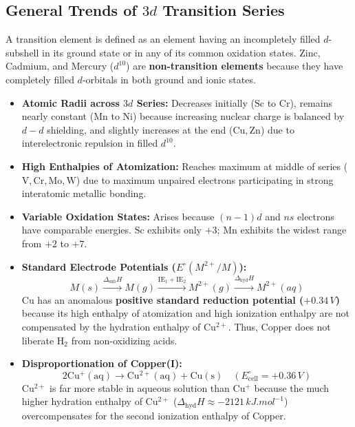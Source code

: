 \documentclass[10pt,a4paper]{article}
\begin{document}
\subsection{General Trends of $3d$ Transition Series}
A transition element is defined as an element having an incompletely filled $d$-subshell in its ground state or in any of its common oxidation states. Zinc, Cadmium, and Mercury ($d^{10}$) are \textbf{non-transition elements} because they have completely filled $d$-orbitals in both ground and ionic states.
\begin{itemize}
  \item \textbf{Atomic Radii across $3d$ Series:} Decreases initially ($\mathrm{Sc}$ to $\mathrm{Cr}$), remains nearly constant ($\mathrm{Mn}$ to $\mathrm{Ni}$) because increasing nuclear charge is balanced by $d-d$ shielding, and slightly increases at the end ($\mathrm{Cu, Zn}$) due to interelectronic repulsion in filled $d^{10}$.
  \item \textbf{High Enthalpies of Atomization:} Reaches maximum at middle of series ($\mathrm{V, Cr, Mo, W}$) due to maximum unpaired electrons participating in strong interatomic metallic bonding.
  \item \textbf{Variable Oxidation States:} Arises because $(n-1)d$ and $ns$ electrons have comparable energies. $\mathrm{Sc}$ exhibits only $+3$; $\mathrm{Mn}$ exhibits the widest range from $+2$ to $+7$.
  \item \textbf{Standard Electrode Potentials ($E^\circ(M^{2+}/M)$):}
  \begin{equation}
    M(s) \xrightarrow{\Delta_{\text{sub}} H} M(g) \xrightarrow{\text{IE}_1 + \text{IE}_2} M^{2+}(g) \xrightarrow{\Delta_{\text{hyd}} H} M^{2+}(aq)
  \end{equation}
  $\mathbf{\mathrm{Cu}}$ has an anomalous \textbf{positive standard reduction potential ($+0.34\,\si{V}$)} because its high enthalpy of atomization and high ionization enthalpy are not compensated by the hydration enthalpy of $\mathrm{Cu^{2+}}$. Thus, Copper does not liberate $\mathrm{H_2}$ from non-oxidizing acids.
  \item \textbf{Disproportionation of Copper(I):}
  \begin{equation}
    2\mathrm{Cu^+(aq)} \longrightarrow \mathrm{Cu^{2+}(aq)} + \mathrm{Cu(s)} \quad (E^\circ_{\text{cell}} = +0.36\,\si{V})
  \end{equation}
  $\mathrm{Cu^{2+}}$ is far more stable in aqueous solution than $\mathrm{Cu^+}$ because the much higher hydration enthalpy of $\mathrm{Cu^{2+}}$ ($\Delta_{\text{hyd}} H \approx -2121\,\si{kJ.mol^{-1}}$) overcompensates for the second ionization enthalpy of Copper.

\end{itemize}
\end{document}
